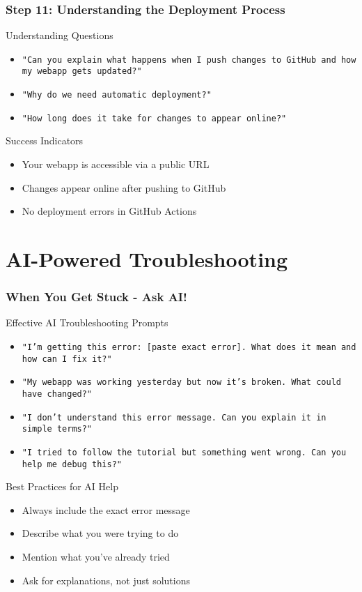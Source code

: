\documentclass[aspectratio=169]{beamer}
\begin{document}
\begin{frame}
\frametitle{Step 11: Understanding the Deployment Process}
\begin{alertblock}{Understanding Questions}
\begin{itemize}
\item \texttt{"Can you explain what happens when I push changes to GitHub and how my webapp gets updated?"}
\item \texttt{"Why do we need automatic deployment?"}
\item \texttt{"How long does it take for changes to appear online?"}
\end{itemize}
\end{alertblock}

\begin{exampleblock}{Success Indicators}
\begin{itemize}
\item Your webapp is accessible via a public URL
\item Changes appear online after pushing to GitHub
\item No deployment errors in GitHub Actions
\end{itemize}
\end{exampleblock}
\end{frame}

\section{AI-Powered Troubleshooting}

\begin{frame}
\frametitle{When You Get Stuck - Ask AI!}
\begin{alertblock}{Effective AI Troubleshooting Prompts}
\begin{itemize}
\footnotesize
\item \texttt{"I'm getting this error: [paste exact error]. What does it mean and how can I fix it?"}
\item \texttt{"My webapp was working yesterday but now it's broken. What could have changed?"}
\item \texttt{"I don't understand this error message. Can you explain it in simple terms?"}
\item \texttt{"I tried to follow the tutorial but something went wrong. Can you help me debug this?"}
\end{itemize}
\end{alertblock}

\begin{exampleblock}{Best Practices for AI Help}
\begin{itemize}
\footnotesize
\item Always include the exact error message
\item Describe what you were trying to do
\item Mention what you've already tried
\item Ask for explanations, not just solutions
\end{itemize}
\end{exampleblock}
\end{frame}
\end{document}
